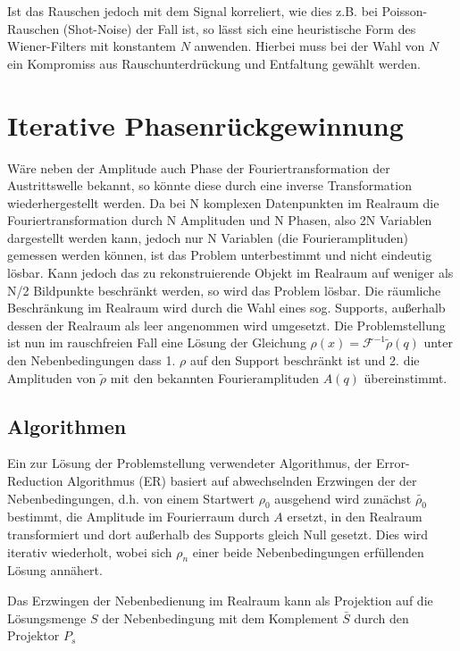 Ist das Rauschen jedoch mit dem Signal korreliert, wie dies z.B. bei Poisson-Rauschen (Shot-Noise) der Fall ist, so lässt sich eine heuristische Form des Wiener-Filters mit konstantem $N$ anwenden. Hierbei muss bei der Wahl von $N$ ein Kompromiss aus Rauschunterdrückung und Entfaltung gewählt werden.

\section{Iterative Phasenrückgewinnung}
Wäre neben der Amplitude auch Phase der Fouriertransformation der Austrittswelle bekannt, so könnte diese durch eine inverse Transformation wiederhergestellt werden. 
Da bei N komplexen Datenpunkten im Realraum die Fouriertransformation durch N Amplituden und N Phasen, also 2N Variablen dargestellt werden kann, jedoch nur N Variablen (die Fourieramplituden) gemessen werden können, ist das Problem unterbestimmt und nicht eindeutig lösbar. Kann jedoch das zu rekonstruierende Objekt im Realraum auf weniger als N/2 Bildpunkte beschränkt werden, so wird das Problem lösbar. Die räumliche Beschränkung im Realraum wird durch die Wahl eines sog. Supports, außerhalb dessen der Realraum als leer angenommen wird umgesetzt.  
Die Problemstellung ist nun im rauschfreien Fall eine Lösung der Gleichung $\rho(x)=\mathscr{F}^{-1}\tilde{\rho}(q)$ unter den Nebenbedingungen dass 1. $\rho$ auf den Support beschränkt ist und 2. die Amplituden von $\tilde{\rho}$ mit den bekannten Fourieramplituden $A(q)$ übereinstimmt.
\subsection{Algorithmen}
Ein zur Lösung der Problemstellung verwendeter Algorithmus, der Error-Reduction Algorithmus (ER) basiert auf abwechselnden Erzwingen der der Nebenbedingungen, d.h. von einem Startwert $\rho_0$ ausgehend wird zunächst $\tilde{\rho_0}$ bestimmt, die Amplitude im Fourierraum durch $A$ ersetzt, in den Realraum transformiert und dort außerhalb des Supports gleich Null gesetzt. Dies wird iterativ wiederholt, wobei sich $\rho_n$ einer beide Nebenbedingungen erfüllenden Lösung annähert.

Das Erzwingen der Nebenbedienung im Realraum kann als Projektion auf die Lösungsmenge $S$ der Nebenbedingung  mit dem Komplement $\bar{S}$ durch den Projektor $P_s$ 

